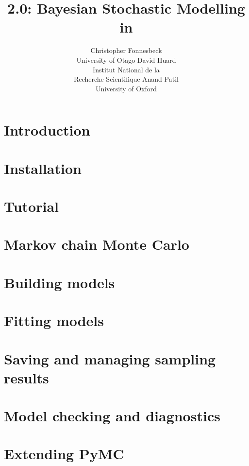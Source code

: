 \documentclass[]{jss}
\author{Christopher Fonnesbeck\\University of Otago \And 
        David Huard\\Institut National de la\\Recherche Scientifique \And
		Anand Patil\\University of Oxford}
\title{\pkg{PyMC} 2.0: Bayesian Stochastic Modelling in \proglang{Python}}
\begin{document}

\section[Introduction]{Introduction} 
\label{sec:intro} 


\section[Installation]{Installation} 
\label{sec:install} 


\section[Tutorial]{Tutorial}
\label{sec:tutorial}


\section[MCMC]{Markov chain Monte Carlo} 
\label{sec:MCMC} 


\section[Building Models]{Building models}
\label{sec:modelbuilding} 


\section[Fitting Models]{Fitting models}
\label{sec:modelfitting}


\section[Sampling Results]{Saving and managing sampling results}
\label{sec:database} 


\section[Model Checking]{Model checking and diagnostics} 
\label{sec:modelchecking}


\section[Extending PyMC]{Extending PyMC}
\label{sec:extending}

\end{document}
